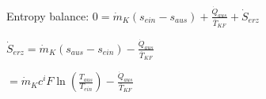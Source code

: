Entropy balance:  
\( 0 = \dot{m}_K (s_{ein} - s_{aus}) + \frac{\dot{Q}_{aus}}{\bar{T}_{KF}} + \dot{S}_{erz} \)  

\( \dot{S}_{erz} = \dot{m}_K (s_{aus} - s_{ein}) - \frac{\dot{Q}_{aus}}{\bar{T}_{KF}} \)  

\( = \dot{m}_K c^i F \ln \left( \frac{T_{aus}}{T_{ein}} \right) - \frac{\dot{Q}_{aus}}{\bar{T}_{KF}} \)